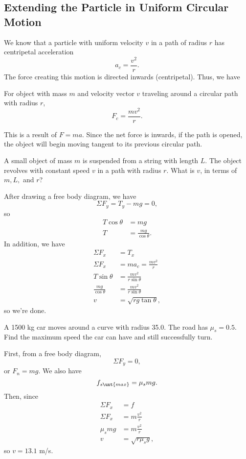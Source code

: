 \documentclass[11pt]{article}
\begin{document}
\subsection{Extending the Particle in Uniform Circular Motion}
We know that a particle with uniform velocity $v$ in a path of radius $r$ has centripetal acceleration
\[a_c = \frac{v^2}{r}.\]
The force creating this motion is directed inwards (centripetal). Thus, we have
\begin{eqn}
	For object with mass $m$ and velocity vector $v$ traveling around a circular path with radius $r$,
	\[F_c = \frac{mv^2}{r}.\]
\end{eqn}
This is a result of $F = ma$. Since the net force is inwards, if the path is opened, the object will begin moving tangent to its previous circular path.
\begin{question}
	A small object of mass $m$ is suspended from a string with length $L$. The object revolves with constant speed $v$ in a path with radius $r$. What is $v$, in terms of $m, L,$ and $r$?
\end{question}
\begin{solution}
	After drawing a free body diagram, we have
	\[\Sigma F_y = T_y - mg = 0,\]
	so
	\begin{align*}
		T\cos\theta &= mg \\
		T &= \frac{mg}{\cos\theta}.
	\end{align*}
	In addition, we have
	\begin{align*}
		\Sigma F_x &= T_x \\
		\Sigma F_x &= ma_c = \frac{mv^2}{r} \\
		T\sin\theta &= \frac{mv^2}{r\sin\theta} \\
		\frac{mg}{\cos\theta} &= \frac{mv^2}{r\sin\theta} \\
		v &= \sqrt{rg\tan\theta},
	\end{align*}
	so we're done.
\end{solution}

\begin{example}
	A 1500 kg car moves around a curve with radius 35.0. The road has $\mu_s = 0.5$. Find the maximum speed the car can have and still successfully turn.
\end{example}
\begin{solution}
	First, from a free body diagram,
	\[\Sigma F_y = 0,\]
	or $F_n = mg$. We also have
	\[f_{s\unt{max}} = \mu_smg.\]
	Then, since
	\begin{align*}
		\Sigma F_x &= f \\
		\Sigma F_x &= m\frac{v^2}{r} \\
		\mu_smg &= m\frac{v^2}{r} \\
		v &= \sqrt{r\mu_sg},
	\end{align*}
	so $v = 13.1$ m/s.
\end{solution}
\end{document}
